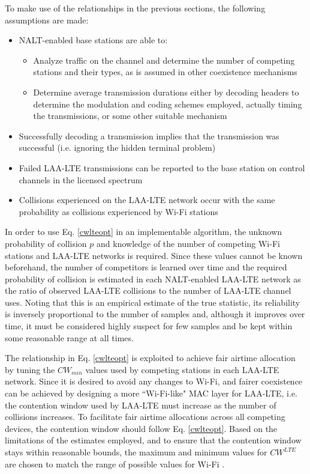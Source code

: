 To make use of the relationships in the previous sections, the following assumptions are made:
\begin{itemize}
	\item NALT-enabled base stations are able to:
	\begin{itemize}
	\item Analyze traffic on the channel and determine the number of competing stations and their types, as is assumed in other coexistence mechanisms
	\item Determine average transmission durations either by decoding headers to determine the modulation and coding schemes employed, actually timing the transmissions, or some other suitable mechanism
	\end{itemize} 
	\item Successfully decoding a transmission implies that the transmission was successful (i.e. ignoring the hidden terminal problem) 
	\item Failed \mbox{LAA-LTE} transmissions can be reported to the base station on control channels in the licensed spectrum
	\item Collisions experienced on the LAA-LTE network occur with the same probability as collisions experienced by Wi-Fi stations
\end{itemize}

In order to use Eq. \ref{cwlteopt} in an implementable algorithm, the unknown probability of collision  $p$ and knowledge of the number of competing Wi-Fi stations and LAA-LTE networks is required. Since these values cannot be known beforehand, the number of competitors is learned over time and the required probability of collision is estimated in each NALT-enabled LAA-LTE network as the ratio of observed \mbox{LAA-LTE} collisions to the number of \mbox{LAA-LTE} channel uses.  Noting that this is an empirical estimate of the true statistic, its reliability is inversely proportional to the number of samples and, although it improves over time, it must be considered highly suspect for few samples and be kept within some reasonable range at all times. 

The relationship in Eq. \ref{cwlteopt} is exploited to achieve fair airtime allocation by tuning the $CW_{min}$ values used by competing stations in each LAA-LTE network.  Since it is desired to avoid any changes to \mbox{Wi-Fi}, and fairer coexistence can be achieved by designing a more \mbox{``\mbox{Wi-Fi}-like"} MAC layer for \mbox{LAA-LTE}, i.e. the contention window used by \mbox{LAA-LTE} must increase as the number of collisions increases.  To facilitate fair airtime allocations across all competing devices, the contention window should follow Eq. \ref{cwlteopt}.  Based on the limitations of the estimates employed, and to ensure that the contention window stays within reasonable bounds, the maximum and minimum values for $CW^{LTE}$ are chosen to match the range of possible values for \mbox{Wi-Fi} \cite{80211}.  

